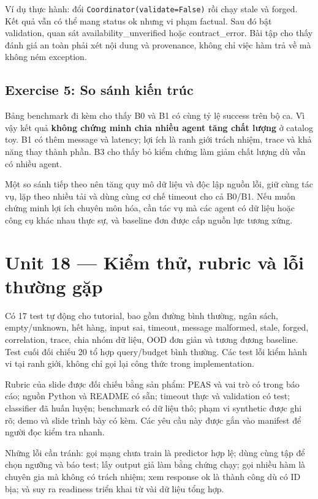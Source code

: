 Ví dụ thực hành: đổi
\passthrough{\lstinline!Coordinator(validate=False)!} rồi chạy stale và
forged. Kết quả vẫn có thể mang status ok nhưng vi phạm factual. Sau đó
bật validation, quan sát availability\_unverified hoặc contract\_error.
Bài tập cho thấy đánh giá an toàn phải xét nội dung và provenance, không
chỉ việc hàm trả về mà không ném exception.

\subsection{Exercise 5: So sánh kiến
trúc}\label{exercise-5-so-suxe1nh-kiux1ebfn-truxfac}

Bảng benchmark đi kèm cho thấy B0 và B1 có cùng tỷ lệ success trên bộ
ca. Vì vậy kết quả \textbf{không chứng minh chia nhiều agent tăng chất
lượng} ở catalog toy. B1 có thêm message và latency; lợi ích là ranh
giới trách nhiệm, trace và khả năng thay thành phần. B3 cho thấy bỏ kiểm
chứng làm giảm chất lượng dù vẫn có nhiều agent.

Một so sánh tiếp theo nên tăng quy mô dữ liệu và độc lập nguồn lỗi, giữ
cùng tác vụ, lặp theo nhiều tải và dùng cùng cơ chế timeout cho cả
B0/B1. Nếu muốn chứng minh lợi ích chuyên môn hóa, cần tác vụ mà các
agent có dữ liệu hoặc công cụ khác nhau thực sự, và baseline đơn được
cấp nguồn lực tương xứng.

\section{Unit 18 --- Kiểm thử, rubric và lỗi thường
gặp}\label{unit-18-kiux1ec3m-thux1eed-rubric-vuxe0-lux1ed7i-thux1b0ux1eddng-gux1eb7p}

Có 17 test tự động cho tutorial, bao gồm đường bình thường, ngân sách,
empty/unknown, hết hàng, input sai, timeout, message malformed, stale,
forged, correlation, trace, chia nhóm dữ liệu, OOD đơn giản và tương
đương baseline. Test cuối đối chiếu 20 tổ hợp query/budget bình thường.
Các test lỗi kiểm hành vi tại ranh giới, không chỉ gọi lại công thức
trong implementation.

Rubric của slide được đối chiếu bằng sản phẩm: PEAS và vai trò có trong
báo cáo; nguồn Python và README có sẵn; timeout thực và validation có
test; classifier đã huấn luyện; benchmark có dữ liệu thô; phạm vi
synthetic được ghi rõ; demo và slide trình bày có kèm. Các yêu cầu này
được gắn vào manifest để người đọc kiểm tra nhanh.

Những lỗi cần tránh: gọi mạng chưa train là predictor hợp lệ; dùng cùng
tập để chọn ngưỡng và báo test; lấy output giả làm bằng chứng chạy; gọi
nhiều hàm là chuyên gia mà không có trách nhiệm; xem response ok là
thành công dù có ID bịa; và suy ra readiness triển khai từ vài dữ liệu
tổng hợp.

